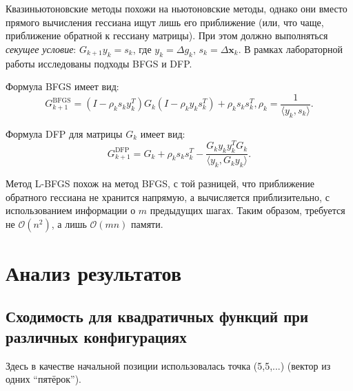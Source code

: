 \documentclass[12pt]{article}
\newcommand\bigo{\mathcal{O}}
\begin{document}
Квазиньютоновские методы похожи на ньютоновские методы, однако они вместо прямого вычисления гессиана ищут лишь его приближение (или, что чаще, приближение обратной к гессиану матрицы). При этом должно выполняться \textit{секущее условие}: $G_{k+1} y_k = s_k$, где $y_k = \Delta g_k$, $s_k = \Delta \textbf{x}_k$. В рамках лабораторной работы исследованы подходы BFGS и DFP.

Формула BFGS имеет вид:
\begin{equation*}
    G_{k+1}^{\text{BFGS}} = (I - \rho_k s_k y_k^T)G_k(I - \rho_k y_k s_k^T) + \rho_k s_k s_k^T, \rho_k = \frac{1}{\langle y_k, s_k \rangle}.
\end{equation*}

Формула DFP для матрицы $G_k$ имеет вид:
\begin{equation*}
    G_{k+1}^{\text{DFP}} = G_k + \rho_k s_k s_k^T - \frac{G_k y_k y_k^T G_k}{\langle y_k, G_k y_k\rangle}.
\end{equation*}

Метод L-BFGS похож на метод BFGS, с той разницей, что приближение обратного гессиана не хранится напрямую, а вычисляется приблизительно, с использованием информации о $m$ предыдущих шагах. Таким образом, требуется не $\bigo(n^2)$, а лишь $\bigo(mn)$ памяти.

\section{Анализ результатов}
\subsection{Сходимость для квадратичных функций при различных конфигурациях}

Здесь в качестве начальной позиции использовалась точка (5,5,...) (вектор из одних \enquote{пятёрок}).
\end{document}

